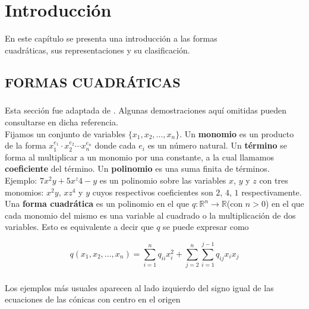\chapter{Introducción}
\begin{center}
	En este capítulo se presenta una introducción a las formas\\ 		
	cuadráticas, sus representaciones y su clasificación.
\end{center}

\section{FORMAS CUADRÁTICAS}

\paragraph*{}
Esta sección fue adaptada de \citep{LayDavidC2001Alys}. Algunas demostraciones aquí omitidas pueden consultarse en dicha referencia.\\
Fijamos un conjunto de variables $\{x_1, x_2, \ldots, x_n\}$. Un \textbf{monomio} es un producto de la forma $x_{1}^{e_{1}} \cdot x_{2}^{e_{2}} \cdots x_{n}^{e_{n}}$ donde cada $e_{i}$ es un número natural. Un \textbf{término} se forma al multiplicar a un monomio por una constante, a la cual llamamos \textbf{coeficiente} del término. Un \textbf{polinomio} es una suma finita de términos.\\
Ejemplo: $7x^{2}y + 5x^z{4} - y$ es un polinomio sobre las variables $x$, $y$ y $z$ con tres monomios: $x^{2}y$, $xz^{4}$ y $y$ cuyos respectivos coeficientes son $2$, $4$, $1$ respectivamente.\\
Una \textbf{forma cuadrática} es un polinomio en el que $q : \mathbb{R}^{n} \rightarrow \mathbb{R}$(con $n > 0$) en el que cada monomio del mismo es una variable al cuadrado o la multiplicación de dos variables. Esto es equivalente a decir que $q$ se puede expresar como

\begin{equation*}
q(x_{1}, x_{2}, \ldots, x_{n}) = \sum_{i=1}^{n} q_{ii}x_{i}^{2}+ \sum_{j=2}^{n}\sum_{i=1}^{j-1} q_{ij}x_{i}x_{j}
\end{equation*}

\paragraph*{}
Los ejemplos más usuales aparecen al lado izquierdo del signo igual de las ecuaciones de las cónicas con centro en el origen

